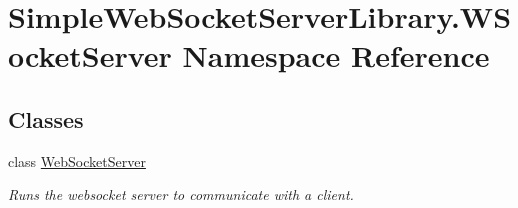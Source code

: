 \hypertarget{namespace_simple_web_socket_server_library_1_1_w_socket_server}{}\section{Simple\+Web\+Socket\+Server\+Library.\+W\+Socket\+Server Namespace Reference}
\label{namespace_simple_web_socket_server_library_1_1_w_socket_server}
\subsection*{Classes}
\begin{DoxyCompactItemize}
\item 
class \mbox{\hyperlink{class_simple_web_socket_server_library_1_1_w_socket_server_1_1_web_socket_server}{Web\+Socket\+Server}}
\begin{DoxyCompactList}\small\item\em Runs the websocket server to communicate with a client. \end{DoxyCompactList}\end{DoxyCompactItemize}
